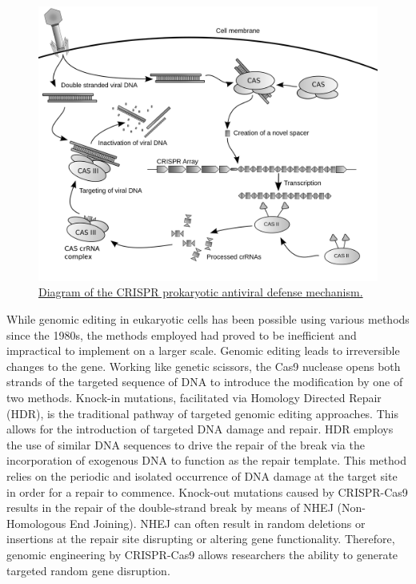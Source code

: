 \begin{figure}

{\centering \includegraphics[width=0.7\linewidth]{./figures/molecular_biology/Crispr} 

}

\caption{\href{https://commons.wikimedia.org/wiki/File:Crispr.png}{Diagram of the CRISPR prokaryotic antiviral defense mechanism.}}\label{fig:crisprdiagram}
\end{figure}

While genomic editing in eukaryotic cells has been possible using various methods since the 1980s, the methods employed had proved to be inefficient and impractical to implement on a larger scale. Genomic editing leads to irreversible changes to the gene. Working like genetic scissors, the Cas9 nuclease opens both strands of the targeted sequence of DNA to introduce the modification by one of two methods. Knock-in mutations, facilitated via Homology Directed Repair (HDR), is the traditional pathway of targeted genomic editing approaches. This allows for the introduction of targeted DNA damage and repair. HDR employs the use of similar DNA sequences to drive the repair of the break via the incorporation of exogenous DNA to function as the repair template. This method relies on the periodic and isolated occurrence of DNA damage at the target site in order for a repair to commence. Knock-out mutations caused by CRISPR-Cas9 results in the repair of the double-strand break by means of NHEJ (Non-Homologous End Joining). NHEJ can often result in random deletions or insertions at the repair site disrupting or altering gene functionality. Therefore, genomic engineering by CRISPR-Cas9 allows researchers the ability to generate targeted random gene disruption.

